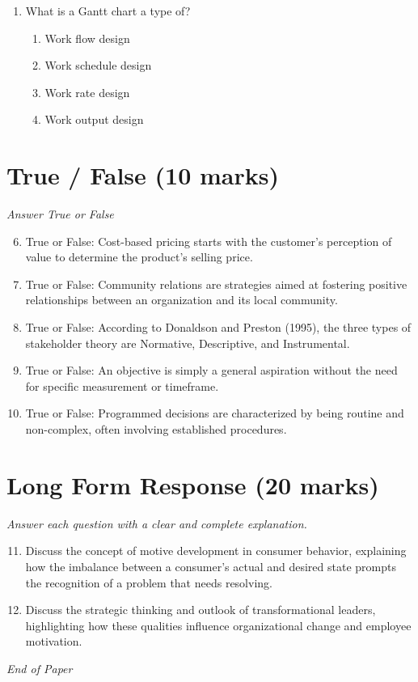 \documentclass[12pt]{article}
\begin{document}
\begin{enumerate}[label=\arabic*.]
\begin{enumerate}[label=(\alph*)]
    \item Sponsorships.
    \item Exhibitions.
    \item Branded content.
    \item Advertisement.
\end{enumerate}
\item What is a Gantt chart a type of?
\begin{enumerate}[label=(\alph*)]
    \item Work flow design
    \item Work schedule design
    \item Work rate design
    \item Work output design
\end{enumerate}
\end{enumerate}

\section*{True / False (10 marks)}
\textit{Answer True or False}
\begin{enumerate}[label=\arabic*.]
\setcounter{enumi}{5}
\item True or False: Cost-based pricing starts with the customer's perception of value to determine the product's selling price.
\item True or False: Community relations are strategies aimed at fostering positive relationships between an organization and its local community.
\item True or False: According to Donaldson and Preston (1995), the three types of stakeholder theory are Normative, Descriptive, and Instrumental.
\item True or False: An objective is simply a general aspiration without the need for specific measurement or timeframe.
\item True or False: Programmed decisions are characterized by being routine and non-complex, often involving established procedures.
\end{enumerate}

\section*{Long Form Response (20 marks)}
\textit{Answer each question with a clear and complete explanation.}
\begin{enumerate}[label=\arabic*.]
\setcounter{enumi}{10}
\item Discuss the concept of motive development in consumer behavior, explaining how the imbalance between a consumer's actual and desired state prompts the recognition of a problem that needs resolving.
\item Discuss the strategic thinking and outlook of transformational leaders, highlighting how these qualities influence organizational change and employee motivation.
\end{enumerate}

\vfill
\noindent\textit{End of Paper}
\end{document}
